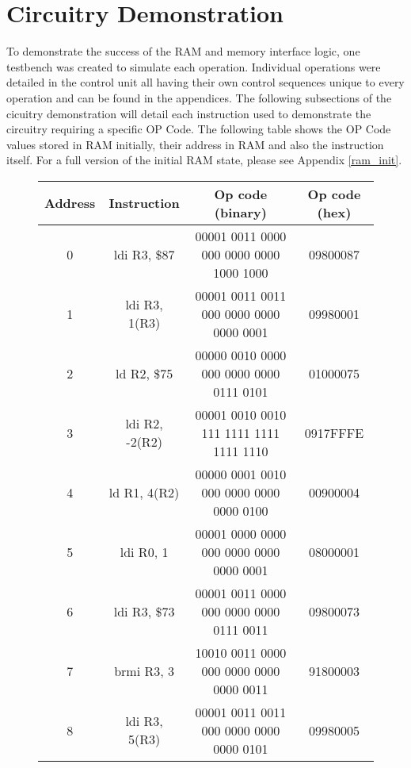 \documentclass{article}
\begin{document}
    
\section{Circuitry Demonstration}
    To demonstrate the success of the RAM and memory interface logic, one testbench was created to simulate each operation. Individual operations were detailed in the control unit
    all having their own control sequences unique to every operation and can be found in the appendices. The following subsections of the cicuitry demonstration will detail 
    each instruction used to demonstrate the circuitry requiring a specific OP Code. The following table shows the OP Code values stored in RAM initially, their address in RAM and also the instruction itself. 
    For a full version of the initial RAM state, please see Appendix \ref{ram_init}. 
    \begin{figure}[h!] \label{relevant_ram_init}
        \begin{center}
            \begin{tabular}{|c|c|c|c|}
                \hline
                Address & Instruction & Op code (binary) & Op code (hex) \\
                \hline
                0 & ldi R3, \$87 & 00001 0011 0000 000 0000 0000 1000 1000 & 09800087 \\
                \hline
                1 & ldi R3, 1(R3) & 00001 0011 0011 000 0000 0000 0000 0001 & 09980001 \\
                \hline
                2 & ld R2, \$75 & 00000 0010 0000 000 0000 0000 0111 0101 & 01000075 \\
                \hline
                3 & ldi R2, -2(R2) & 00001 0010 0010 111 1111 1111 1111 1110 & 0917FFFE \\
                \hline
                4 & ld R1, 4(R2) & 00000 0001 0010 000 0000 0000 0000 0100 & 00900004 \\
                \hline
                5 & ldi R0, 1 & 00001 0000 0000 000 0000 0000 0000 0001 & 08000001 \\
                \hline
                6 & ldi R3, \$73 & 00001 0011 0000 000 0000 0000 0111 0011 & 09800073 \\
                \hline
                7 & brmi R3, 3 & 10010 0011 0000 000 0000 0000 0000 0011 & 91800003 \\
                \hline
                8 & ldi R3, 5(R3) & 00001 0011 0011 000 0000 0000 0000 0101 & 09980005 \\
                \hline

\end{tabular}
\end{center}
\end{figure}
\end{document}
